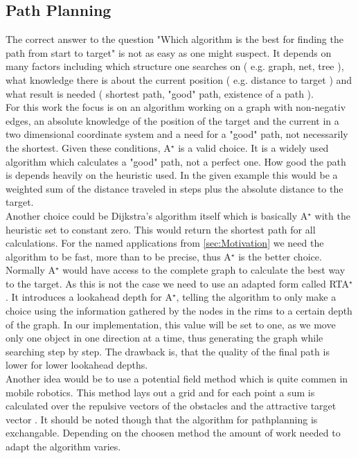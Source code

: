 \subsection{Path Planning}
The correct answer to the question "Which algorithm is the best for finding the path from start to target" is not as easy as one might suspect. 
It depends on many factors including which structure one searches on ( e.g. graph, net, tree ), what knowledge there is about the current position ( e.g. distance to target ) and what result is needed ( shortest path, "good" path, existence of a path ).\\
For this work the focus is on an algorithm working on a graph with non-negativ edges, an absolute knowledge of the position of the target and the current in a two dimensional coordinate system and a need for a "good" path, not necessarily the shortest. Given these conditions, A$^\star$ \cite{ComputerScience} is a valid choice. It is a widely used algorithm which calculates a "good" path, not a perfect one. How good the path is depends heavily on the heuristic used. In the given example this would be a weighted sum of the distance traveled in steps plus the absolute distance to the target.\\
Another choice could be Dijkstra's algorithm \cite{ComputerScience} itself which is basically A$^\star$ with the heuristic set to constant zero. This would return the shortest path for all calculations. For the named applications from \ref{sec:Motivation} we need the algorithm to be fast, more than to be precise, thus A$^\star$ is the better choice.\\
Normally A$^\star$ would have access to the complete graph to calculate the best way to the target. As this is not the case we need to use an adapted form called RTA$^\star$ \cite{rta}. It introduces a lookahead depth for A$^\star$, telling the algorithm to only make a choice using the information gathered by the nodes in the rims to a certain depth of the graph. In our implementation, this value will be set to one, as we move only one object in one direction at a time, thus generating the graph while searching step by step. The drawback is, that the quality of the final path is lower for lower lookahead depths.\\
Another idea would be to use a potential field method which is quite commen in mobile robotics. This method lays out a grid and for each point a sum is calculated over the repulsive vectors of the obstacles and the attractive target vector \cite{hwang1992potential}. 
It should be noted though that the algorithm for pathplanning is exchangable. Depending on the choosen method the amount of work needed to adapt the algorithm varies.

